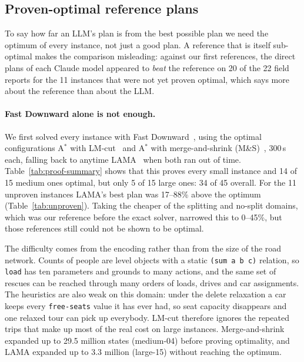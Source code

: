 
\subsection{Proven-optimal reference plans}
\label{sec:exact}

To say how far an LLM's plan is from the best possible plan we need the optimum of every
instance, not just a good plan. A reference that is itself sub-optimal makes the comparison
misleading: against our first references, the direct plans of each Claude model appeared to \emph{beat} the
reference on 20 of the 22 field reports for the 11 instances that were not yet proven
optimal, which says more about the reference than about the LLM.

\paragraph{Fast Downward alone is not enough.}
We first solved every instance with Fast Downward~\cite{helmert2006fd}, using the optimal
configurations A$^*$ with LM-cut~\cite{helmert2009lmcut} and A$^*$ with merge-and-shrink
(M\&S)~\cite{helmert2014ms}, 300\,s each, falling back to anytime LAMA~\cite{richter2010lama}
when both ran out of time. Table~\ref{tab:proof-summary} shows that this proves every small
instance and 14 of 15 medium ones optimal, but only 5 of 15 large ones: 34 of 45 overall.
For the 11 unproven instances LAMA's best plan was 17--88\% above the optimum
(Table~\ref{tab:unproven}). Taking the cheaper of the splitting and no-split domains, which was
our reference before the exact solver, narrowed this to 0--45\%, but those references still
could not be shown to be optimal.

The difficulty comes from the encoding rather than from the size of the road network.
Counts of people are level objects with a static \texttt{(sum a b c)} relation, so
\texttt{load} has ten parameters and grounds to many actions, and the same set of rescues can
be reached through many orders of loads, drives and car assignments. The heuristics are also
weak on this domain: under the delete relaxation a car keeps every \texttt{free-seats} value it
has ever had, so seat capacity disappears and one relaxed tour can pick up everybody. LM-cut
therefore ignores the repeated trips that make up most of the real cost on large instances.
Merge-and-shrink expanded up to 29.5 million states (medium-04) before proving optimality, and
LAMA expanded up to 3.3 million (large-15) without reaching the optimum.

